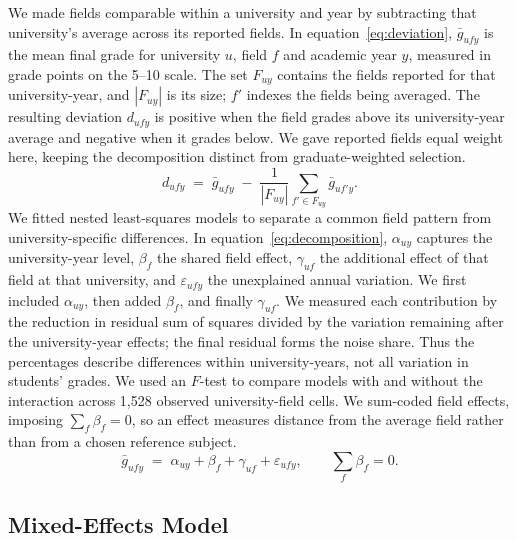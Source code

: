 We made fields comparable within a university and year by subtracting that university's average across its reported fields. In equation~\eqref{eq:deviation}, $\bar g_{ufy}$ is the mean final grade for university $u$, field $f$ and academic year $y$, measured in grade points on the 5--10 scale. The set $F_{uy}$ contains the fields reported for that university-year, and $|F_{uy}|$ is its size; $f'$ indexes the fields being averaged. The resulting deviation $d_{ufy}$ is positive when the field grades above its university-year average and negative when it grades below. We gave reported fields equal weight here, keeping the decomposition distinct from graduate-weighted selection.
\begin{equation}
  d_{ufy} \;=\; \bar g_{ufy} \;-\; \frac{1}{|F_{uy}|}\sum_{f' \in F_{uy}} \bar g_{uf'y}.
  \label{eq:deviation}
\end{equation}
We fitted nested least-squares models to separate a common field pattern from university-specific differences. In equation~\eqref{eq:decomposition}, $\alpha_{uy}$ captures the university-year level, $\beta_f$ the shared field effect, $\gamma_{uf}$ the additional effect of that field at that university, and $\varepsilon_{ufy}$ the unexplained annual variation. We first included $\alpha_{uy}$, then added $\beta_f$, and finally $\gamma_{uf}$. We measured each contribution by the reduction in residual sum of squares divided by the variation remaining after the university-year effects; the final residual forms the noise share. Thus the percentages describe differences within university-years, not all variation in students' grades. We used an $F$-test to compare models with and without the interaction across 1,528 observed university-field cells. We sum-coded field effects, imposing $\sum_f\beta_f=0$, so an effect measures distance from the average field rather than from a chosen reference subject.
\begin{equation}
  \bar g_{ufy} \;=\; \alpha_{uy} + \beta_f + \gamma_{uf} + \varepsilon_{ufy},
  \qquad \textstyle\sum_f \beta_f = 0.
  \label{eq:decomposition}
\end{equation}
\subsection{Mixed-Effects Model}
\label{sec:methods-mixed}

